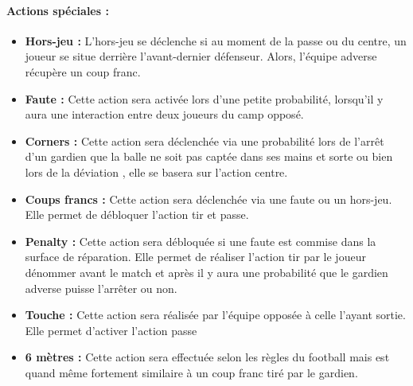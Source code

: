 \paragraph{Actions spéciales :}

\begin{itemize}
    \item  \textbf{Hors-jeu :} L’hors-jeu se déclenche si au moment de la passe ou du centre, un joueur se situe derrière l’avant-dernier défenseur. Alors, l'équipe adverse récupère un coup franc.

    \vspace{10pt}

    \item \textbf{Faute :} Cette action sera activée lors d’une petite probabilité, lorsqu'il y aura une interaction entre deux joueurs du camp opposé.

    \vspace{10pt}

    \item \textbf{Corners :} Cette action sera déclenchée via une probabilité lors de l'arrêt d’un gardien que la balle ne soit pas captée dans ses mains et sorte ou bien lors de la déviation , elle se basera sur l’action centre.

    \vspace{10pt}

    \item \textbf{Coups francs :} Cette action sera déclenchée via une faute ou un hors-jeu. Elle permet de débloquer l’action tir et passe.

    \vspace{10pt}

    \item \textbf{Penalty :} Cette action sera débloquée si une faute est commise dans la surface de réparation. Elle permet de réaliser l’action tir par le joueur dénommer avant le match et après il y aura une probabilité que le gardien adverse puisse l'arrêter ou non.

    \vspace{10pt}

    \item \textbf{Touche :} Cette action sera réalisée par l’équipe opposée à celle l’ayant sortie. Elle permet d'activer l’action passe

    \vspace{10pt}

    \item \textbf{6 mètres :} Cette action sera effectuée selon les règles du football mais est quand même fortement similaire à un coup franc tiré par le gardien.
\end{itemize}

